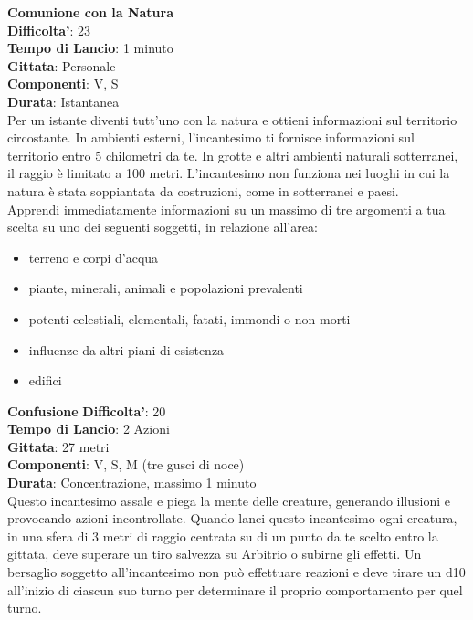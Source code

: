 \begin{multicols}{2}
\medskip\textbf{Comunione con la Natura}\\
\textbf{Difficolta'}: 23\\
\textbf{Tempo di Lancio}: 1 minuto\\
\textbf{Gittata}: Personale\\
\textbf{Componenti}: V, S\\
\textbf{Durata}: Istantanea\\
Per un istante diventi tutt’uno con la natura e ottieni informazioni sul territorio circostante. In ambienti esterni, l’incantesimo ti fornisce informazioni sul territorio entro 5 chilometri da te. In grotte e altri  ambienti naturali sotterranei, il raggio è limitato a 100 metri. L’incantesimo non funziona nei luoghi in cui la natura è stata soppiantata da costruzioni, come in sotterranei e paesi.\\
Apprendi immediatamente informazioni su un massimo di tre argomenti a tua scelta su uno dei seguenti soggetti, in relazione all’area:
\begin{itemize}
	\item 
	terreno e corpi d’acqua
	\item 
	piante, minerali, animali e popolazioni prevalenti
	\item 
    potenti celestiali, elementali, fatati, immondi o non morti
	\item 
    influenze da altri piani di esistenza
	\item
    edifici
\end{itemize}

\medskip\textbf{Confusione}
\textbf{Difficolta'}: 20\\
\textbf{Tempo di Lancio}: 2 Azioni\\
\textbf{Gittata}: 27 metri\\
\textbf{Componenti}: V, S, M (tre gusci di noce)\\
\textbf{Durata}: Concentrazione, massimo 1 minuto\\
Questo incantesimo assale e piega la mente delle creature, generando illusioni e provocando azioni incontrollate. Quando lanci questo incantesimo ogni creatura, in una sfera di 3 metri di raggio centrata su di un punto da te scelto entro la gittata, deve superare un tiro salvezza su Arbitrio o subirne gli effetti. Un bersaglio soggetto all’incantesimo non può effettuare reazioni e deve tirare un d10 all’inizio di ciascun suo turno per determinare il proprio comportamento per quel turno. 


\end{multicols}
